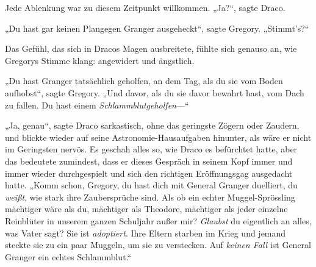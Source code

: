 Jede Ablenkung war zu diesem Zeitpunkt willkommen. „Ja?“, sagte Draco.

„Du hast gar keinen Plangegen Granger ausgeheckt“, sagte Gregory. „Stimmt’s?“

Das Gefühl, das sich in Dracos Magen ausbreitete, fühlte sich genauso an, wie Gregorys Stimme klang: angewidert und ängstlich.

„Du hast Granger tatsächlich geholfen, an dem Tag, als du sie vom Boden aufhobst“, sagte Gregory. „Und davor, als du sie davor bewahrt hast, vom Dach zu fallen. Du hast einem \emph{Schlammblutgeholfen}—“

„Ja, genau“, sagte Draco sarkastisch, ohne das geringste Zögern oder Zaudern, und blickte wieder auf seine Astronomie-Hausaufgaben hinunter, als wäre er nicht im Geringsten nervös. Es geschah alles so, wie Draco es befürchtet hatte, aber das bedeutete zumindest, dass er dieses Gespräch in seinem Kopf immer und immer wieder durchgespielt und sich den richtigen Eröffnungsgag ausgedacht hatte. „Komm schon, Gregory, du hast dich mit General Granger duelliert, du \emph{weißt}, wie stark ihre Zaubersprüche sind. Als ob ein echter Muggel-Sprössling mächtiger wäre als du, mächtiger als Theodore, mächtiger als jeder einzelne Reinblüter in unserem ganzen Schuljahr außer mir? \emph{Glaubst} du eigentlich an alles, was Vater sagt? Sie ist \emph{adoptiert}. Ihre Eltern starben im Krieg und jemand steckte sie zu ein paar Muggeln, um sie zu verstecken. Auf \emph{keinen Fall} ist General Granger ein echtes Schlammblut.“

